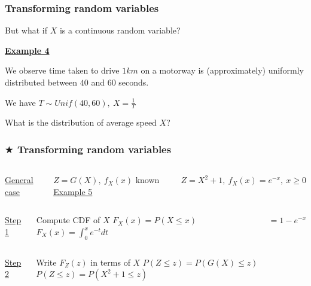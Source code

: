 \documentclass[t,8pt]{beamer}%
\begin{document}
\begin{frame}
	\frametitle{Transforming random variables}
	But what if $X$ is a continuous random variable? \par
	{\bf\underline{Example 4}} \par 
	We observe time taken to drive $1km$ on a motorway is (approximately) uniformly distributed between $40$ and $60$ seconds. \par
    We have $T\sim Unif(40,60),\ X=\frac 1T$ \par 
	What is the distribution of average speed $X$?
\end{frame}

\begin{frame}[t]
	\frametitle{$\bigstar$ Transforming random variables}
	{\small
		\begin{minipage}{\textwidth}
			\begin{columns}[T]
				\underline{General case} \par
				$Z=G(X),\ f_X(x)$ known
				\underline{Example 5} \par
				$Z=X^2+1,\ f_X(x)=e^{-x},\ x\geq 0$
			\end{columns}
		\end{minipage} \par
		\begin{minipage}{\textwidth}
			\begin{columns}[T]
				\underline{Step 1} \par
				Compute CDF of $X$
				\hfill \break \hfill \break
				$F_X(x)=P(X\leq x)$
				\column{0.4\textwidth}
				\hfill \break \hfill \break
				$F_X(x)=\int_0^xe^{-t}dt$ \par
				$\qquad\quad\ =1-e^{-x}$
			\end{columns}
		\end{minipage} \par
		\begin{minipage}{\textwidth}
			\begin{columns}[T]
				\column{0.17\textwidth}
				\underline{Step 2} \par
				Write $F_Z(z)$ in terms of $X$
				\column{0.35\textwidth}
				\hfill \break \hfill \break
				$P(Z\leq z)=P(G(X)\leq z)$
				\hfill \break \hfill \break
				$P(Z\leq z)=P(X^2+1\leq z)$
			\end{columns}
		\end{minipage} \par
}
\end{frame}
\end{document}

